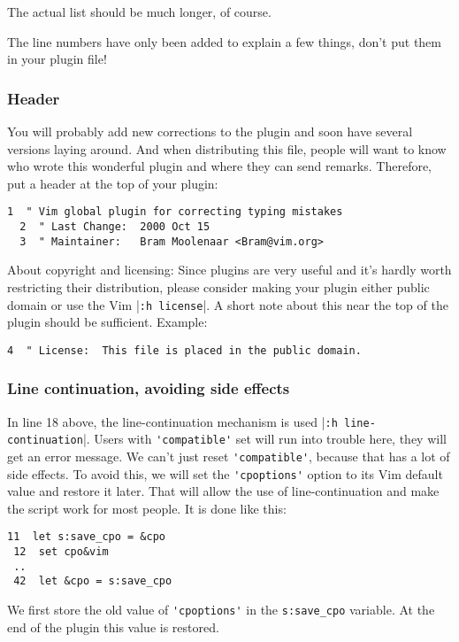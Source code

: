 The actual list should be much longer, of course.

The line numbers have only been added to explain a few things, don't put them in your plugin file!
\subsubsection{Header}
You will probably add new corrections to the plugin and soon have several versions laying around.
And when distributing this file, people will want to know who wrote this wonderful plugin and where they can send remarks.
Therefore, put a header at the top of your plugin:

\begin{Verbatim}[samepage=true]
  1  " Vim global plugin for correcting typing mistakes
  2  " Last Change:  2000 Oct 15
  3  " Maintainer:   Bram Moolenaar <Bram@vim.org>
\end{Verbatim}

About copyright and licensing: Since plugins are very useful and it's hardly worth restricting their distribution, please consider making your plugin either public domain or use the Vim |\verb!:h license!|.
A short note about this near the top of the plugin should be sufficient.
Example:

\begin{Verbatim}[samepage=true]
  4  " License:  This file is placed in the public domain.
\end{Verbatim}

\subsubsection{Line continuation, avoiding side effects}
\label{use-cpo-save}

In line 18 above, the line-continuation mechanism is used |\verb!:h line-continuation!|.
Users with \verb!'compatible'! set will run into trouble here, they will get an error message.
We can't just reset \verb!'compatible'!, because that has a lot of side effects.
To avoid this, we will set the \verb!'cpoptions'! option to its Vim default value and restore it later.
That will allow the use of line-continuation and make the script work for most people.
It is done like this:

\begin{Verbatim}[samepage=true]
 11  let s:save_cpo = &cpo
 12  set cpo&vim
 ..
 42  let &cpo = s:save_cpo
\end{Verbatim}

We first store the old value of \verb!'cpoptions'! in the \verb!s:save_cpo! variable.
At the end of the plugin this value is restored.

